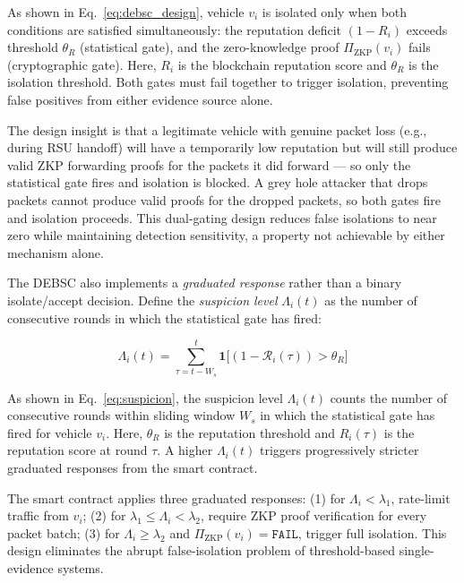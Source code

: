 \documentclass[12pt, a4paper]{report}
\begin{document}
As shown in Eq.~\eqref{eq:debsc_design}, vehicle $v_i$ is isolated only when both conditions are satisfied simultaneously: the reputation deficit $(1 - R_i)$ exceeds threshold $\theta_R$ (statistical gate), and the zero-knowledge proof $\Pi_{\text{ZKP}}(v_i)$ fails (cryptographic gate). Here, $R_i$ is the blockchain reputation score and $\theta_R$ is the isolation threshold. Both gates must fail together to trigger isolation, preventing false positives from either evidence source alone.

The design insight is that a legitimate vehicle with genuine packet loss
(e.g., during RSU handoff) will have a temporarily low reputation but
will still produce valid ZKP forwarding proofs for the packets it did
forward — so only the statistical gate fires and isolation is blocked.
A grey hole attacker that drops packets cannot produce valid proofs for
the dropped packets, so both gates fire and isolation proceeds. This
dual-gating design reduces false isolations to near zero while maintaining
detection sensitivity, a property not achievable by either mechanism alone.

The DEBSC also implements a \emph{graduated response} rather than a
binary isolate/accept decision. Define the \emph{suspicion level}
$\Lambda_i(t)$ as the number of consecutive rounds in which the statistical
gate has fired:

\begin{equation}
\label{eq:suspicion}
\Lambda_i(t) = \sum_{\tau=t-W_s}^{t}
\mathbf{1}\bigl[(1-\mathcal{R}_i(\tau)) > \theta_R\bigr]
\end{equation}

As shown in Eq.~\eqref{eq:suspicion}, the suspicion level $\Lambda_i(t)$ counts the number of consecutive rounds within sliding window $W_s$ in which the statistical gate has fired for vehicle $v_i$. Here, $\theta_R$ is the reputation threshold and $R_i(\tau)$ is the reputation score at round $\tau$. A higher $\Lambda_i(t)$ triggers progressively stricter graduated responses from the smart contract.



The smart contract applies three graduated responses: (1) for
$\Lambda_i < \lambda_1$, rate-limit traffic from $v_i$; (2) for
$\lambda_1 \leq \Lambda_i < \lambda_2$, require ZKP proof verification
for every packet batch; (3) for $\Lambda_i \geq \lambda_2$ and
$\Pi_{\mathrm{ZKP}}(v_i) = \texttt{FAIL}$, trigger full isolation.
This design eliminates the abrupt false-isolation problem of
threshold-based single-evidence systems.
\end{document}
